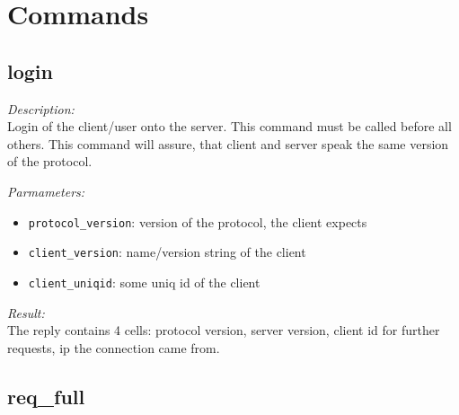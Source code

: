 \section{Commands}

\subsection{login}

\begin{description}
\item {\it Description:}\\
Login of the client/user onto the server. This command must be called before all others. This command will assure, that client and server speak the same version of the protocol.
\item {\it Parmameters:}
\begin{itemize}
\item {\tt protocol\_version}: version of the protocol, the client expects
\item {\tt client\_version}: name/version string of the client
\item {\tt client\_uniqid}: some uniq id of the client
\end{itemize}
\item {\it Result:}\\
The reply contains 4 cells: protocol version, server version, client id for further requests, ip the connection came from.
\end{description}

\subsection{req\_full}

